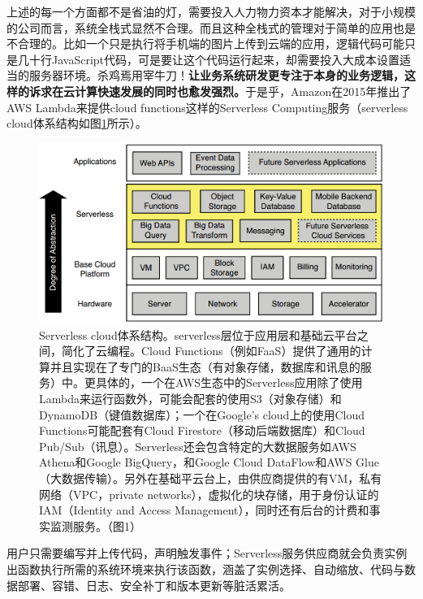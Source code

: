 \documentclass[11pt]{article}
\begin{document}
上述的每一个方面都不是省油的灯，需要投入人力物力资本才能解决，对于小规模的公司而言，系统全栈式显然不合理。而且这种全栈式的管理对于简单的应用也是不合理的。比如一个只是执行将手机端的图片上传到云端的应用，逻辑代码可能只是几十行JavaScript代码，可是要让这个代码运行起来，却需要投入大成本设置适当的服务器环境。杀鸡焉用宰牛刀！\textbf{让业务系统研发更专注于本身的业务逻辑，这样的诉求在云计算快速发展的同时也愈发强烈。}于是乎，Amazon在2015年推出了AWS Lambda来提供cloud functions这样的Serverless Computing服务（serverless cloud体系结构如图\ref{figs:architecture1}所示）。
\begin{figure}[!htbp]
	\centering
	\includegraphics[width=0.8\linewidth]{figs/architecture}
	\caption{Serverless cloud体系结构。serverless层位于应用层和基础云平台之间，简化了云编程。Cloud Functions（例如FaaS）提供了通用的计算并且实现在了专门的BaaS生态（有对象存储，数据库和讯息的服务）中。更具体的，一个在AWS生态中的Serverless应用除了使用Lambda来运行函数外，可能会配套的使用S3（对象存储）和DynamoDB（键值数据库）；一个在Google's cloud上的使用Cloud Functions可能配套有Cloud Firestore（移动后端数据库）和Cloud Pub/Sub（讯息）。Serverless还会包含特定的大数据服务如AWS Athena和Google BigQuery，和Google Cloud DataFlow和AWS Glue（大数据传输）。另外在基础平云台上，由供应商提供的有VM，私有网络（VPC，private networks），虚拟化的块存储，用于身份认证的IAM（Identity and Access Management），同时还有后台的计费和事实监测服务。（\cite{jonas2019cloud}图1）}
	\label{figs:architecture1}
\end{figure}
用户只需要编写并上传代码，声明触发事件；Serverless服务供应商就会负责实例出函数执行所需的系统环境来执行该函数，涵盖了实例选择、自动缩放、代码与数据部署、容错、日志、安全补丁和版本更新等脏活累活。
\end{document}
